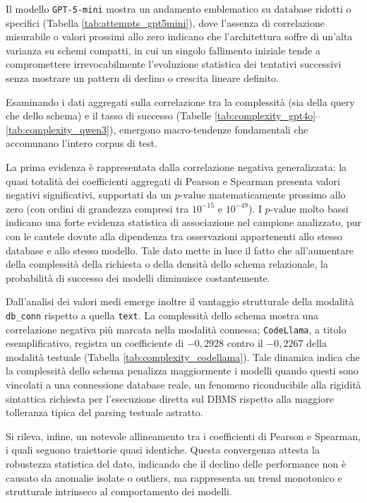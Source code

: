 Il modello \texttt{GPT-5-mini} mostra un andamento emblematico su
database ridotti o specifici (Tabella \ref{tab:attempts_gpt5mini}), dove l'assenza di
correlazione misurabile o valori prossimi allo zero indicano che
l'architettura soffre di un'alta varianza su schemi compatti, in cui un
singolo fallimento iniziale tende a compromettere irrevocabilmente l'evoluzione
statistica dei tentativi successivi senza mostrare un pattern di declino
o crescita lineare definito.

Esaminando i dati aggregati sulla correlazione tra la complessità (sia
della query che dello schema) e il tasso di successo (Tabelle
\ref{tab:complexity_gpt4o}--\ref{tab:complexity_qwen3}), emergono macro-tendenze fondamentali che accomunano
l'intero corpus di test.

La prima evidenza è rappresentata dalla correlazione negativa
generalizzata: la quasi totalità dei coefficienti aggregati di Pearson e
Spearman presenta valori negativi significativi, supportati da un
\(p\text{-value}\) matematicamente prossimo allo zero (con ordini di
grandezza compresi tra \(10^{-15}\) e \(10^{-49}\)). I \(p\text{-value}\) 
molto bassi indicano una forte evidenza statistica di associazione nel 
campione analizzato, pur con le cautele dovute alla dipendenza tra osservazioni 
appartenenti allo stesso database e allo stesso modello. Tale dato mette in luce il fatto
che all'aumentare della complessità della richiesta o della densità dello schema 
relazionale, la probabilità di successo dei modelli diminuisce costantemente.

Dall'analisi dei valori medi emerge inoltre il vantaggio strutturale
della modalità \texttt{db\_conn} rispetto a quella \texttt{text}. La
complessità dello schema mostra una correlazione negativa più marcata nella modalità connessa;
\texttt{CodeLlama}, a titolo esemplificativo, registra un coefficiente
di \(-0,2928\) contro il \(-0,2267\) della modalità testuale (Tabella
\ref{tab:complexity_codellama}). Tale dinamica indica che la complessità dello schema penalizza
maggiormente i modelli quando questi sono vincolati a una connessione
database reale, un fenomeno riconducibile alla rigidità sintattica
richiesta per l'esecuzione diretta sul DBMS rispetto alla maggiore
tolleranza tipica del parsing testuale astratto.

Si rileva, infine, un notevole allineamento tra i coefficienti di
Pearson e Spearman, i quali seguono traiettorie quasi identiche. Questa
convergenza attesta la robustezza statistica del dato, indicando che
il declino delle performance non è causato da anomalie isolate o
outliers, ma rappresenta un trend monotonico e strutturale
intrinseco al comportamento dei modelli.


